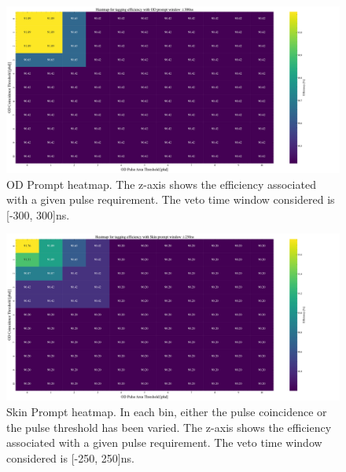 \begin{figure}
     \centering
     \includegraphics[width=\textwidth]{figures/VetoEfficiency/HeatmapODPACoinScanWindow600.pdf}
     \caption{OD Prompt heatmap. 
     The z-axis shows the efficiency associated with a given pulse requirement.
     The veto time window considered is [-300, 300]ns.
     }
     \label{fig:od_prompt_veto_heatmap}
\end{figure}  
\begin{figure}
     \centering
     \includegraphics[width=\textwidth]{figures/VetoEfficiency/HeatmapSkinPACoinScanWindow500.pdf}
     \caption{Skin Prompt heatmap.
     In each bin, either the pulse coincidence or the pulse threshold has been varied.
     The z-axis shows the efficiency associated with a given pulse requirement.
     The veto time window considered is [-250, 250]ns.}
     \label{fig:skin_prompt_veto_heatmap}
\end{figure}
